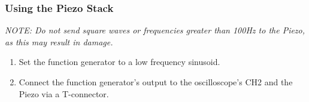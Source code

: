     \subsubsection{Using the Piezo Stack}
        
        \emph{NOTE: Do not send square waves or frequencies greater than 100Hz
        to the Piezo, as this may result in damage.}
        \begin{enumerate}
        \item Set the function generator to a low frequency sinusoid.
        \item Connect the function generator's output to the oscilloscope's CH2
        and the Piezo via a T-connector.
        \end{enumerate}
